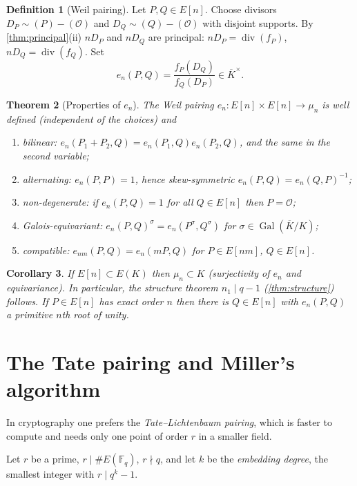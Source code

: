 \documentclass[11pt,a4paper,oneside]{book}
\theoremstyle{plain}
\newtheorem{theorem}{Theorem}[chapter]
\newtheorem{corollary}[theorem]{Corollary}
\theoremstyle{definition}
\newtheorem{definition}[theorem]{Definition}
\theoremstyle{remark}
\newcommand{\Fq}{\mathbb{F}_q}
\newcommand{\Oinf}{\mathcal{O}}
\newcommand{\Kbar}{\overline{K}}
\newcommand{\Gal}{\operatorname{Gal}}
\newcommand{\divv}{\operatorname{div}}
\begin{document}
\begin{definition}[Weil pairing]\label{def:weil}
Let $P,Q\in E[n]$. Choose divisors $D_P\sim(P)-(\Oinf)$ and $D_Q\sim(Q)-(\Oinf)$ with disjoint supports. By \cref{thm:principal}(ii) $nD_P$ and $nD_Q$ are principal: $nD_P=\divv(f_P)$, $nD_Q=\divv(f_Q)$. Set
\[
e_n(P,Q)=\frac{f_P(D_Q)}{f_Q(D_P)}\in\Kbar^\times .
\]
\end{definition}

\begin{theorem}[Properties of $e_n$]\label{thm:weilprops}
The Weil pairing $e_n:E[n]\times E[n]\to\mu_n$ is well defined (independent of the choices) and
\begin{enumerate}[nosep,label=(\roman*)]
\item \emph{bilinear:} $e_n(P_1+P_2,Q)=e_n(P_1,Q)e_n(P_2,Q)$, and the same in the second variable;
\item \emph{alternating:} $e_n(P,P)=1$, hence skew-symmetric $e_n(P,Q)=e_n(Q,P)^{-1}$;
\item \emph{non-degenerate:} if $e_n(P,Q)=1$ for all $Q\in E[n]$ then $P=\Oinf$;
\item \emph{Galois-equivariant:} $e_n(P,Q)^\sigma=e_n(P^\sigma,Q^\sigma)$ for $\sigma\in\Gal(\Kbar/K)$;
\item \emph{compatible:} $e_{nm}(P,Q)=e_n(mP,Q)$ for $P\in E[nm]$, $Q\in E[n]$.
\end{enumerate}
\end{theorem}

\begin{corollary}\label{cor:muN}
If $E[n]\subset E(K)$ then $\mu_n\subset K$ (surjectivity of $e_n$ and equivariance). In particular, the structure theorem $n_1\mid q-1$ (\cref{thm:structure}) follows. If $P\in E[n]$ has exact order $n$ then there is $Q\in E[n]$ with $e_n(P,Q)$ a primitive $n$th root of unity.
\end{corollary}

\section{The Tate pairing and Miller's algorithm}

In cryptography one prefers the \emph{Tate--Lichtenbaum pairing}, which is faster to compute and needs only one point of order $r$ in a smaller field.

Let $r$ be a prime, $r\mid\#E(\Fq)$, $r\nmid q$, and let $k$ be the \emph{embedding degree}, the smallest integer with $r\mid q^k-1$. 
\end{document}
